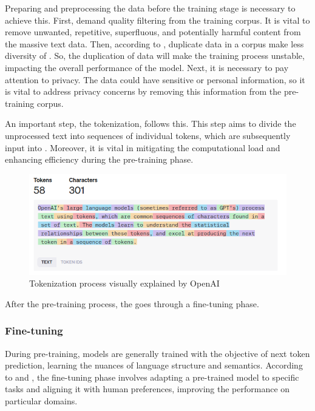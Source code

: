 Preparing and preprocessing the data before the training stage is necessary to achieve this. First, demand quality filtering from the training corpus. It is vital to remove unwanted, repetitive, superfluous, and potentially harmful content from the massive text data. Then, according to \citet{hadi_LLM_2023}, duplicate data in a corpus make less diversity of {\llm}. So, the duplication of data will make the training process unstable, impacting the overall performance of the model. Next, it is necessary to pay attention to privacy. The data could have sensitive or personal information, so it is vital to address privacy concerns by removing this information from the pre-training corpus.

An important step, the tokenization, follows this. This step aims to divide the unprocessed text into sequences of individual tokens, which are subsequently input into {\llm}. Moreover, it is vital in mitigating the computational load and enhancing efficiency during the pre-training phase.

\begin{figure}[ht]
    \includegraphics[width=14cm]{figs/chapter2/tokenization.png}
    \centering
    \caption{Tokenization process visually explained by OpenAI \cite{noauthor_openai_nodate}}
\end{figure}

After the pre-training process, the {\llm} goes through a fine-tuning phase.


\subsubsection{Fine-tuning}

During pre-training, models are generally trained with the objective of next token prediction, learning the nuances of language structure and semantics. According to \citet{kamnis_generative_2023} and \citet{hadi_LLM_2023}, the fine-tuning phase involves adapting a pre-trained model to specific tasks and aligning it with human preferences, improving the performance on particular domains.

